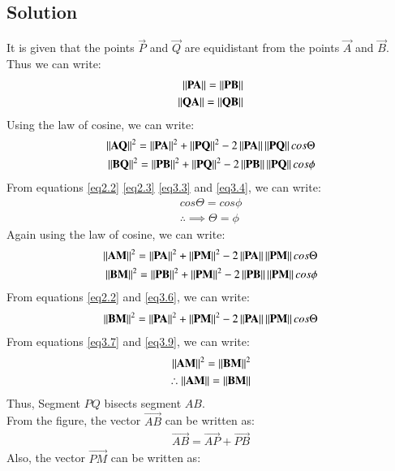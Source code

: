 \documentclass[journal,12pt,twocolumn]{IEEEtran}
\begin{document}
\subsection{Solution}
It is given that the points $\vec{P}$ and $\vec{Q}$  are equidistant from the points $\vec{A}$ and $\vec{B}$. Thus we can write:
\begin{align}
    \left\lVert\mathbf{PA}\right\rVert=\left\lVert\mathbf{PB}\right\rVert \label{eq2.2}\\
    \left\lVert\mathbf{QA}\right\rVert=\left\lVert\mathbf{QB}\right\rVert \label{eq2.3}
\end{align}
Using the law of cosine, we can write:
\begin{align}
    \left\lVert\mathbf{AQ}\right\rVert^2= \left\lVert\mathbf{PA}\right\rVert^2+ \left\lVert\mathbf{PQ}\right\rVert^2-2 \left\lVert\mathbf{PA}\right\rVert \left\lVert\mathbf{PQ}\right\rVert cos \Theta \label{eq3.3}\\
    \left\lVert\mathbf{BQ}\right\rVert^2= \left\lVert\mathbf{PB}\right\rVert^2+ \left\lVert\mathbf{PQ}\right\rVert^2-2 \left\lVert\mathbf{PB}\right\rVert \left\lVert\mathbf{PQ}\right\rVert cos \phi \label{eq3.4}
\end{align}
From equations \ref{eq2.2} \ref{eq2.3} \ref{eq3.3} and \ref{eq3.4}, we can write:
\begin{align}
    cos \Theta = cos \phi \\
    \therefore \implies \Theta = \phi \label{eq3.6}
\end{align}
Again using the law of cosine, we can write:
\begin{align}
    \left\lVert\mathbf{AM}\right\rVert^2= \left\lVert\mathbf{PA}\right\rVert^2+ \left\lVert\mathbf{PM}\right\rVert^2-2 \left\lVert\mathbf{PA}\right\rVert \left\lVert\mathbf{PM}\right\rVert cos \Theta \label{eq3.7}\\
    \left\lVert\mathbf{BM}\right\rVert^2= \left\lVert\mathbf{PB}\right\rVert^2+ \left\lVert\mathbf{PM}\right\rVert^2-2 \left\lVert\mathbf{PB}\right\rVert \left\lVert\mathbf{PM}\right\rVert cos \phi \label{eq3.8}
\end{align}
From equations \ref{eq2.2} and \ref{eq3.6}, we can write:
\begin{align}
  \left\lVert\mathbf{BM}\right\rVert^2= \left\lVert\mathbf{PA}\right\rVert^2+ \left\lVert\mathbf{PM}\right\rVert^2-2 \left\lVert\mathbf{PA}\right\rVert \left\lVert\mathbf{PM}\right\rVert cos \Theta  \label{eq3.9}
\end{align}
From equations \ref{eq3.7} and \ref{eq3.9}, we can write:
\begin{align}
    \left\lVert\mathbf{AM}\right\rVert^2=\left\lVert\mathbf{BM}\right\rVert^2 \\
    \therefore \left\lVert\mathbf{AM}\right\rVert=\left\lVert\mathbf{BM}\right\rVert
\end{align}
Thus, Segment $PQ$ bisects segment $AB$. \\
From the figure, the vector $\vec{AB}$ can be written as:
\begin{align}
\vec{AB}=\vec{AP}+\vec{PB} \label{eq3.12}
\end{align}
Also, the vector $\vec{PM}$ can be written as:
\end{document}
